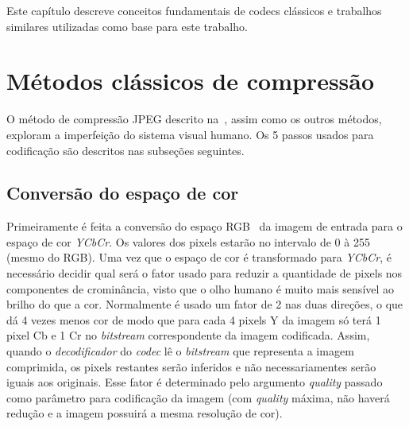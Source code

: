 \newcommand{\texCommand}[1]{\texttt{\textbackslash{#1}}}%

\newcommand{\exemplo}[1]{%
\vspace{\baselineskip}%
\noindent\fbox{\begin{minipage}{\textwidth}#1\end{minipage}}%
\\\vspace{\baselineskip}}%

\newcommand{\exemploVerbatim}[1]{%
\vspace{\baselineskip}%
\noindent\fbox{\begin{minipage}{\textwidth}%
#1\end{minipage}}%
\\\vspace{\baselineskip}}%

Este capítulo descreve conceitos fundamentais de codecs clássicos e trabalhos similares utilizadas como base para este trabalho.
\section{Métodos clássicos de compressão}
O método de compressão JPEG descrito na~, assim como os outros métodos, exploram a 
imperfeição do sistema visual humano. Os 5 passos usados para codificação  são descritos nas subseções seguintes.
\subsection{Conversão do espaço de cor}
Primeiramente é feita a conversão do espaço RGB~\cite{opencv} da imagem de entrada para o espaço de cor \textit{YCbCr}. Os valores dos pixels estarão no intervalo de 0 à 255 (mesmo do RGB).
Uma vez que o espaço de cor é transformado para \textit{YCbCr}, é necessário decidir qual será o fator usado para reduzir a quantidade de pixels nos componentes de crominância, visto que o olho humano é muito mais sensível ao brilho do que a cor. Normalmente é usado um fator de 2 nas duas direções, o que dá 4 vezes menos cor de modo que para cada 4 pixels Y da imagem só terá 1 pixel Cb e 1 Cr no \textit{bitstream} correspondente da imagem codificada. Assim, quando o \textit{decodificador} do \textit{codec} lê o \textit{bitstream} que representa a imagem comprimida, os pixels restantes serão inferidos e não necessariamentes serão iguais aos originais. Esse fator é determinado pelo argumento \textit{quality} passado como parâmetro para codificação da imagem (com \textit{quality} máxima, não haverá redução e a imagem possuirá a mesma resolução de cor).

